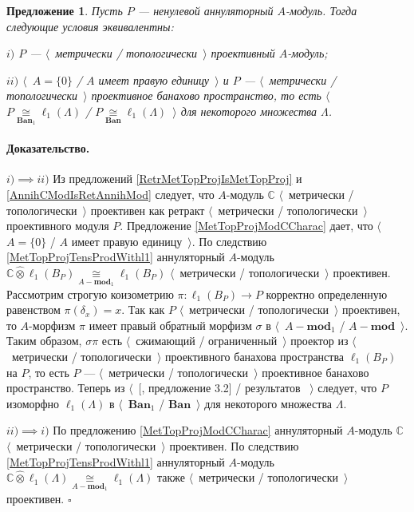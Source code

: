 \documentclass[12pt]{article}
\newcommand{\projtens}{\mathbin{\widehat{\otimes}}}
\newcommand{\isom}[1]{\mathop{\mathbin{\cong}}\limits_{#1}}
\newtheorem{proposition}[theorem]{Предложение}
\renewenvironment{proof}{\paragraph{Доказательство.}}{\hfill$\square$\medskip}
\begin{document}
\begin{proposition}\label{MetTopProjOfAnnihModCharac} Пусть $P$ --- ненулевой аннуляторный $A$-модуль. Тогда следующие условия эквивалентны:

$i)$ $P$ --- $\langle$~метрически / топологически~$\rangle$ проективный $A$-модуль;

$ii)$ $\langle$~$A=\{0\}$ / $A$ имеет правую единицу~$\rangle$ и $P$ --- $\langle$~метрически / топологически~$\rangle$ проективное банахово пространство, то есть $\langle$~$P\isom{\mathbf{Ban}_1}\ell_1(\Lambda)$ / $P\isom{\mathbf{Ban}}\ell_1(\Lambda)$~$\rangle$ для некоторого множества $\Lambda$.
\end{proposition}
\begin{proof} $i)$$\implies$$ ii)$ Из предложений \ref{RetrMetTopProjIsMetTopProj} и \ref{AnnihCModIsRetAnnihMod} следует, что $A$-модуль $\mathbb{C}$ $\langle$~метрически / топологически~$\rangle$ проективен как ретракт $\langle$~метрически / топологически~$\rangle$ проективного модуля $P$. Предложение \ref{MetTopProjModCCharac} дает, что $\langle$~$A=\{0\}$ / $A$ имеет правую единицу~$\rangle$.  По следствию \ref{MetTopProjTensProdWithl1} аннуляторный $A$-модуль $\mathbb{C}\projtens\ell_1(B_P)\isom{A-\mathbf{mod}_1}\ell_1(B_P)$ $\langle$~метрически / топологически~$\rangle$ проективен. Рассмотрим строгую коизометрию $\pi:\ell_1(B_P)\to P$ корректно определенную равенством $\pi(\delta_x)=x$. Так как $P$ $\langle$~метрически / топологически~$\rangle$ проективен, то $A$-морфизм $\pi$ имеет правый обратный морфизм $\sigma$ в $\langle$~$A-\mathbf{mod}_1$ / $A-\mathbf{mod}$~$\rangle$. Таким образом, $\sigma\pi$ есть $\langle$~сжимающий / ограниченный~$\rangle$ проектор из $\langle$~метрически / топологически~$\rangle$ проективного банахова пространства $\ell_1(B_P)$ на $P$, то есть $P$ --- $\langle$~метрически / топологически~$\rangle$ проективное банахово пространство. Теперь из $\langle$~[\cite{HelMetrFrQMod}, предложение 3.2] / результатов \cite{KotheTopProjBanSp}~$\rangle$ следует, что $P$ изоморфно $\ell_1(\Lambda)$ в $\langle$~$\mathbf{Ban}_1$ / $\mathbf{Ban}$~$\rangle$ для некоторого множества $\Lambda$. 

$ii)$$\implies$$ i)$ По предложению \ref{MetTopProjModCCharac} аннуляторный $A$-модуль $\mathbb{C}$ $\langle$~метрически / топологически~$\rangle$ проективен. По следствию \ref{MetTopProjTensProdWithl1} аннуляторный $A$-модуль $\mathbb{C}\projtens\ell_1(\Lambda)\isom{A-\mathbf{mod}_1}\ell_1(\Lambda)$ также $\langle$~метрически / топологически~$\rangle$ проективен.
\end{proof}
\end{document}
